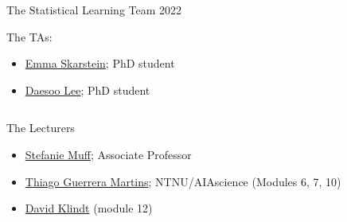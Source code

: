 \documentclass[10pt,ignorenonframetext,]{beamer}
\providecommand{\tightlist}{%
  \setlength{\itemsep}{0pt}\setlength{\parskip}{0pt}}
\begin{document}
\begin{frame}{The Statistical Learning Team 2022}
\protect\hypertarget{the-statistical-learning-team-2022}{}

\begin{block}{The TAs:}

\vspace{2mm}

\begin{itemize}
\tightlist
\item
  \href{https://www.ntnu.no/ansatte/emma.s.skarstein}{Emma Skarstein};
  PhD student
\item
  \href{https://www.ntnu.no/ansatte/daesoo.lee}{Daesoo Lee}; PhD student
\end{itemize}

\(~\)

\end{block}

\begin{block}{The Lecturers}

\vspace{2mm}

\begin{itemize}
\tightlist
\item
  \href{https://www.ntnu.edu/employees/stefanie.muff}{Stefanie Muff};
  Associate Professor
\item
  \href{https://www.ntnu.no/ansatte/thiago.guerrera}{Thiago Guerrera
  Martins}; NTNU/AIAscience (Modules 6, 7, 10)
\item
  \href{https://www.ntnu.no/ansatte/david.klindt}{David Klindt} (module
  12)
\end{itemize}

\end{block}

\end{frame}
\end{document}
